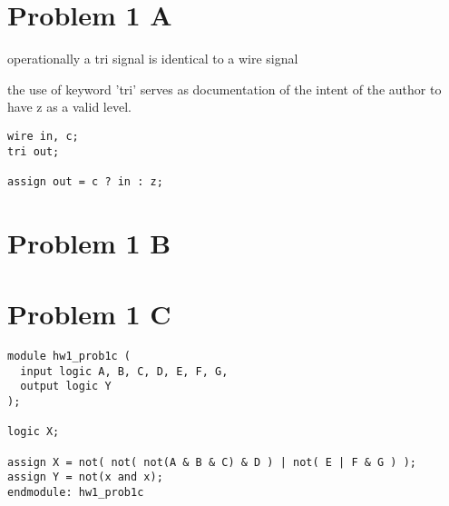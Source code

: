\documentclass{article}
\begin{document}
\section{Problem 1 A}
operationally a tri signal is identical to a wire signal

the use of keyword 'tri' serves as documentation of the intent of the author to have z as a valid level.

\begin{verbatim}
wire in, c;
tri out;

assign out = c ? in : z;
\end{verbatim}

\section{Problem 1 B}
\section{Problem 1 C}

\begin{verbatim}
module hw1_prob1c (
  input logic A, B, C, D, E, F, G,
  output logic Y
);

logic X;

assign X = not( not( not(A & B & C) & D ) | not( E | F & G ) );
assign Y = not(x and x);
endmodule: hw1_prob1c
\end{verbatim}
\end{document}
